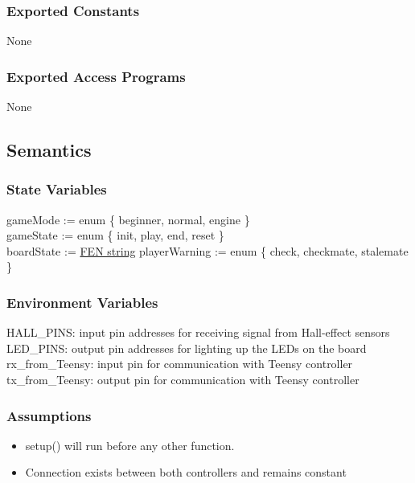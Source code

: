 \documentclass[12pt, titlepage]{article}
\begin{document}
\subsubsection{Exported Constants}{
  None
}

\subsubsection{Exported Access Programs}
None

\subsection{Semantics}

\subsubsection{State Variables}{
  gameMode := enum \{ beginner, normal, engine \}\\
  gameState := enum \{ init, play, end, reset \}\\
  boardState := \href{https://en.wikipedia.org/wiki/Forsyth%E2%80%93Edwards_Notation}{FEN string}
  playerWarning := enum \{ check, checkmate, stalemate \}\\
}

\subsubsection{Environment Variables}{
  HALL\_PINS: input pin addresses for receiving signal from Hall-effect sensors\\
  LED\_PINS: output pin addresses for lighting up the LEDs on the board\\
  rx\_from\_Teensy: input pin for communication with Teensy controller\\
  tx\_from\_Teensy: output pin for communication with Teensy controller\\
}

\subsubsection{Assumptions}{
  \begin{itemize}
    \item setup() will run before any other function.
    \item Connection exists between both controllers and remains constant
  \end{itemize}
  
}
\end{document}
